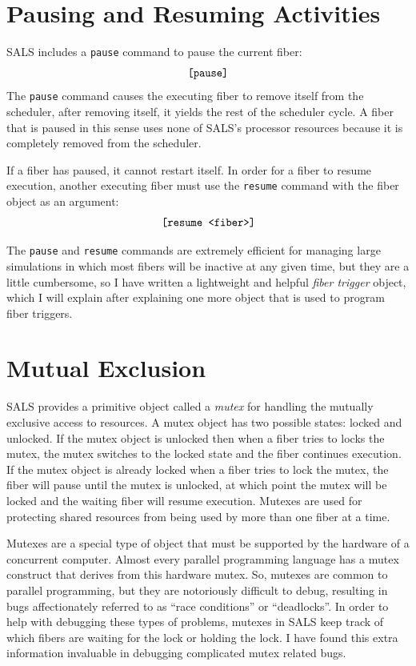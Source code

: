 \section{Pausing and Resuming Activities}

SALS includes a {\tt pause} command to pause the current fiber:
\begin{equation*}
\text{\tt [pause]}
\end{equation*}
The {\tt pause} command causes the executing fiber to remove itself
from the scheduler, after removing itself, it yields the rest of the
scheduler cycle.  A fiber that is paused in this sense uses none of
SALS's processor resources because it is completely removed from
the scheduler.

If a fiber has paused, it cannot restart itself.  In order for a fiber
to resume execution, another executing fiber must use the
{\tt resume} command with the fiber object as an argument:
\begin{equation*}
\text{\tt [resume <fiber>]}
\end{equation*}

The {\tt pause} and {\tt resume} commands are extremely efficient for
managing large simulations in which most fibers will be inactive at
any given time, but they are a little cumbersome, so I have written a
lightweight and helpful \emph{fiber trigger} object, which I will
explain after explaining one more object that is used to program fiber
triggers.

\section{Mutual Exclusion}

SALS provides a primitive object called a \emph{mutex} for handling
the mutually exclusive access to resources.  A mutex object has two
possible states: locked and unlocked.  If the mutex object is unlocked
then when a fiber tries to locks the mutex, the mutex switches to the
locked state and the fiber continues execution.  If the mutex object
is already locked when a fiber tries to lock the mutex, the fiber will
pause until the mutex is unlocked, at which point the mutex will be
locked and the waiting fiber will resume execution.  Mutexes are used
for protecting shared resources from being used by more than one fiber
at a time.

Mutexes are a special type of object that must be supported by the
hardware of a concurrent computer.  Almost every parallel programming
language has a mutex construct that derives from this hardware mutex.
So, mutexes are common to parallel programming, but they are
notoriously difficult to debug, resulting in bugs affectionately
referred to as ``race conditions'' or ``deadlocks''.  In order to help
with debugging these types of problems, mutexes in SALS keep track of
which fibers are waiting for the lock or holding the lock.  I have
found this extra information invaluable in debugging complicated mutex
related bugs.

